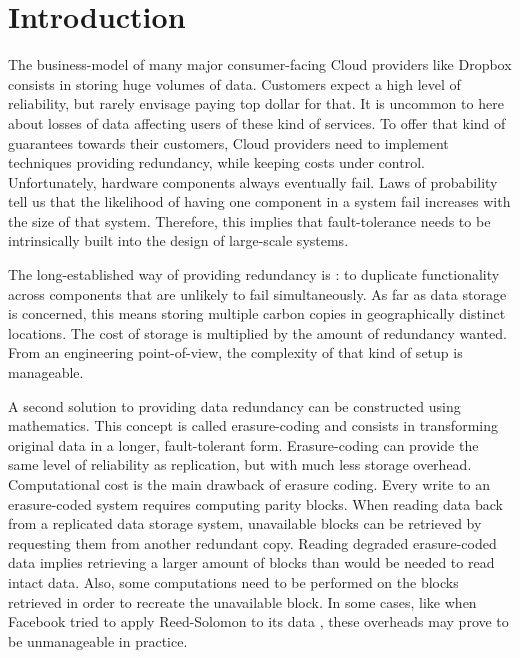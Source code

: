 \chapter{Introduction}

The business-model of many major consumer-facing Cloud providers like Dropbox consists in storing huge volumes of data.
Customers expect a high level of reliability, but rarely envisage paying top dollar for that.
It is uncommon to here about losses of data affecting users of these kind of services.
To offer that kind of guarantees towards their customers, Cloud providers need to implement techniques providing redundancy, while keeping costs under control.
Unfortunately, hardware components always eventually fail.
Laws of probability tell us that the likelihood of having one component in a system fail increases with the size of that system.
Therefore, this implies that fault-tolerance needs to be intrinsically built into the design of large-scale systems.

The long-established way of providing redundancy is : to duplicate functionality across components that are unlikely to fail simultaneously.
As far as data storage is concerned, this means storing multiple carbon copies in geographically distinct locations.
The cost of storage is multiplied by the amount of redundancy wanted.
From an engineering point-of-view, the complexity of that kind of setup is manageable.

A second solution to providing data redundancy can be constructed using mathematics.
This concept is called erasure-coding and consists in transforming original data in a longer, fault-tolerant form.
Erasure-coding can provide the same level of reliability as replication, but with much less storage overhead.
Computational cost is the main drawback of erasure coding.
Every write to an erasure-coded system requires computing parity blocks.
When reading data back from a replicated data storage system, unavailable blocks can be retrieved by requesting them from another redundant copy.
Reading degraded erasure-coded data implies retrieving a larger amount of blocks than would be needed to read intact data.
Also, some computations need to be performed on the blocks retrieved in order to recreate the unavailable block.
In some cases, like when Facebook tried to apply Reed-Solomon to its data \autocite{XorbasVLDB}, these overheads may prove to be unmanageable in practice.

